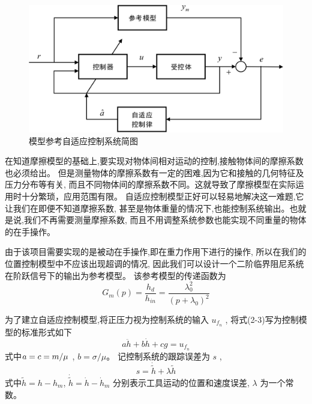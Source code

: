 \begin{figure}[!ht]
  \centering
  \includegraphics[scale=0.6]{chapter02/pic/2-2}
  \caption{模型参考自适应控制系统简图}
  \label{fig:2-2}
  \vspace{-0.3cm}
\end{figure}

在知道摩擦模型的基础上,要实现对物体间相对运动的控制,接触物体间的摩擦系数也必须给出。
但是测量物体的摩擦系数有一定的困难,因为它和接触的几何特征及压力分布等有关,
而且不同物体间的摩擦系数不同。这就导致了摩擦模型在实际运用时十分繁琐，应用范围有限。
自适应控制模型正好可以轻易地解决这一难题,它让我们在即便不知道摩擦系数,
甚至是物体重量的情况下,也能控制系统输出。也就是说,我们不再需要测量摩擦系数,
而且不用调整系统参数也能实现不同重量的物体的在手操作。

由于该项目需要实现的是被动在手操作,即在重力作用下进行的操作,
所以在我们的位置控制模型中不应该出现超调的情况,
因此我们可以设计一个二阶临界阻尼系统在阶跃信号下的输出为参考模型。
该参考模型的传递函数为
\begin{equation}
  {G_m}(p) = \frac{{{h_d}}}{{{h_{in}}}} = \frac{{\lambda _0^2}}{{{{\left( {p + {\lambda _0}} \right)}^2}}}
  \label{equ:2-4}
\end{equation}

为了建立自适应控制模型,将正压力视为控制系统的输入 $u_{f_n}$ ,
将式(2-3)写为控制模型的标准形式如下
\begin{equation}
  a\ddot h + b\dot h + cg = {u_{{f_n}}}
  \label{euq:2-5}
\end{equation}
式中$a = c = {m \mathord{\left/
{\vphantom {m \mu }} \right.
\kern-\nulldelimiterspace} \mu }$ , $b = \sigma /\mu $。
记控制系统的跟踪误差为 $s$ ,
\begin{equation}
  s = \dot{\tilde h}  + \lambda \tilde h
  \label{euq:2-6}
\end{equation}
式中$\tilde h = h - {h_m}$, $\dot{\tilde h} = \dot h - {\dot h_m}$
分别表示工具运动的位置和速度误差, $\lambda$ 为一个常数。

